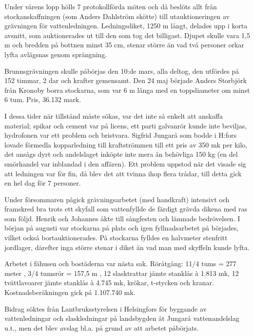 

Under vårens lopp hölls 7 protokollförda möten och då beslöts allt 	från stockanskaffningen (som Anders Dahlström skötte) till utauktioneringen av grävningen för vattenledningen. Ledningsdiket, 1250 m långt, delades upp i korta avsnitt, som auktionerades ut till den som tog det billigast. Djupet skulle vara 1,5 m och bredden på bottnen minst 35 cm, stenar större än vad två personer orkar lyfta	avlägsnas genom sprängning.

Brunnsgrävningen skulle påbörjas den 10:de mars, alla deltog, den utfördes på 152 timmar, 2 dar och krafter gemensamt. Den 24 maj började Anders Storbjörk från Kronoby borra stockarna, som var 6 m långa med en toppdiameter om minst 6 tum. Pris, 36.132 mark.

I dessa tider när tillstånd måste sökas, var det inte så enkelt att anskaffa material; spikar och cement var på licens, ett parti galvanrör kunde inte beviljas, hydrofonen var ett problem och bristvara. Sigfrid Jungarå som bodde i H:fors lovade förmedla kopparledning till kraftströmmen till ett pris av 350 mk per kilo, det ansågs dyrt och andelslaget inköpte inte mera än behövliga 150 kg (en del smörhandel var inblandad i den affären). Ett problem uppstod när det visade sig att ledningen var för fin, då 	blev det att tvinna ihop flera trådar, till detta gick en hel dag för 7 personer.

Under försommaren pågick grävningsarbetet (med handkraft) intensivt och framskred bra trots ett skyfall som vattenfyllde de färdigt grävda dikena med ras som följd. Henrik och Johannes åkte till sångfesten och lämnade bedrövelsen. I början på augusti var stockarna på plats och igen fyllnadsarbetet på börjades, vilket 	också bortauktionerades. På stockarna fylldes en halvmeter 	stenfritt jordlager, därefter inga större stenar i diket än vad man med skyffeln kunde lyfta.

Arbetet i fähusen och bostäderna var nästa sak. Röråtgång: 11/4 tums = 277 meter , 3/4 tumsrör = 157,5 m , 12 slasktrattar jämte stanklås à 1.813 mk, 12 tvättlavoarer jämte stanklås à 4.745 mk, krökar, t-stycken och kranar. Kostnadsberäkningen gick på 1.107.740 mk.

Bidrag söktes från Lantbruksstyrelsen i Helsingfors för byggande av vattenledningar och slaskledningar på landsbygden åt Jungarå vattenandelslag u.t.,  men det blev avslag bl.a. på grund av att arbetet påbörjats.

